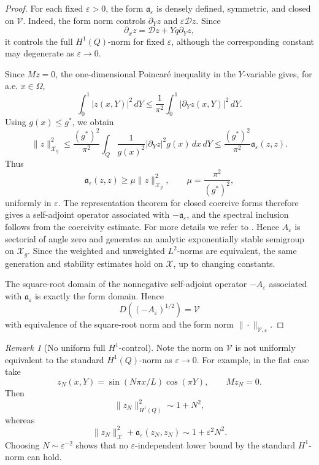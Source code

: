 \documentclass[11pt]{article}
\theoremstyle{definition}
\theoremstyle{remark}
\newtheorem{remark}[theorem]{Remark}
\numberwithin{equation}{section}
\newcommand{\mc}[1]{\mathcal{#1}}
\begin{document}
\begin{proof}
For each fixed \(\varepsilon>0\), the form
\(\mathfrak a_\varepsilon\) is densely defined, symmetric, and closed on
\(\mathcal V\). Indeed, the form norm controls \(\partial_Yz\) and
\(\varepsilon\mathcal Dz\). Since
\[
\partial_xz=\mathcal Dz+Yq\partial_Yz,
\]
it controls the full \(H^1(Q)\)-norm for fixed \(\varepsilon\), although the
corresponding constant may degenerate as \(\varepsilon\to0\).

Since \(Mz=0\), the one-dimensional Poincar\'e inequality in the \(Y\)-variable
gives, for a.e. \(x\in\Omega\),
\[
\int_0^1 |z(x,Y)|^2\,dY
\le
\frac1{\pi^2}
\int_0^1 |\partial_Yz(x,Y)|^2\,dY .
\]
Using \(g(x)\le g^*\), we obtain
\[
\|z\|_{\mathcal X_g}^2
\le
\frac{(g^*)^2}{\pi^2}
\int_Q \frac1{g(x)^2}|\partial_Yz|^2g(x)\,dx\,dY
\le
\frac{(g^*)^2}{\pi^2}\mathfrak a_\varepsilon(z,z).
\]
Thus
\[
\mathfrak a_\varepsilon(z,z)
\ge
\mu\|z\|_{\mathcal X_g}^2,
\qquad
\mu=\frac{\pi^2}{(g^*)^2},
\]
uniformly in \(\varepsilon\). The representation theorem for closed coercive
forms therefore gives a self-adjoint operator associated with
\(-\mathfrak a_\varepsilon\), and the spectral inclusion follows from the
coercivity estimate.
For more details we refer to \cite{Kato1966,ouhabaz2009analysis}.
Hence \(A_\varepsilon\) is sectorial of angle zero and
generates an analytic exponentially stable semigroup on \(\mathcal X_g\).
Since the weighted and unweighted \(L^2\)-norms are equivalent, the same
generation and stability estimates hold on \(\mathcal X\), up to changing
constants.

The square-root domain of the nonnegative self-adjoint operator
\(-A_\varepsilon\) associated with \(\mathfrak a_\varepsilon\) is exactly the
form domain. Hence
\[
D((-A_\varepsilon)^{1/2})=\mathcal V
\]
with equivalence of the square-root norm and the form norm
\(\|\cdot\|_{\mathcal V,\varepsilon}\).
\end{proof}

\begin{remark}[No uniform full \(H^1\)-control]
Note the norm on $\mc V$ is not uniformly equivalent to the standard \(H^1(Q)\)-norm as \(\varepsilon\to0\). 
For example, in the flat case
take
\[
z_N(x,Y)=\sin(N\pi x/L)\cos(\pi Y),
\qquad Mz_N=0.
\]
Then
\[
\|z_N\|_{H^1(Q)}^2\sim 1+N^2,
\]
whereas
\[
\|z_N\|_{\mathcal X}^2+\mathfrak a_\varepsilon(z_N,z_N)
\sim
1+\varepsilon^2N^2.
\]
Choosing \(N\sim\varepsilon^{-2}\) shows that no \(\varepsilon\)-independent
lower bound by the standard \(H^1\)-norm can hold.
\end{remark}
\end{document}
